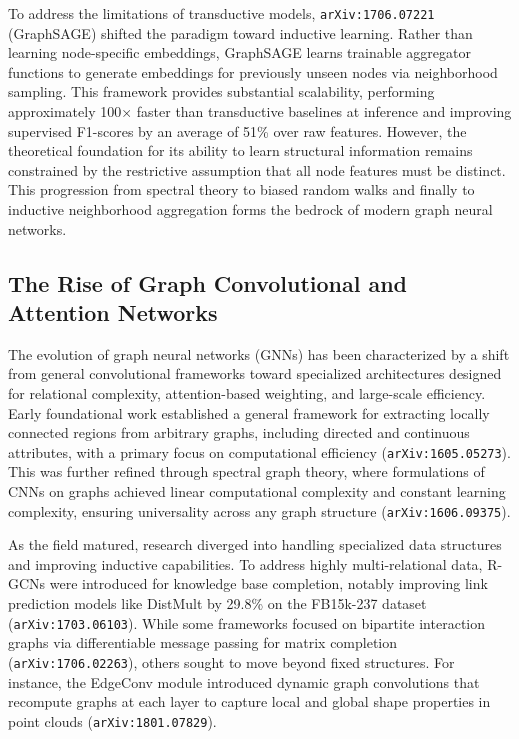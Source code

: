 \documentclass[11pt]{article}
\begin{document}
To address the limitations of transductive models, \texttt{arXiv:1706.07221} (GraphSAGE) shifted the paradigm toward inductive learning. Rather than learning node-specific embeddings, GraphSAGE learns trainable aggregator functions to generate embeddings for previously unseen nodes via neighborhood sampling. This framework provides substantial scalability, performing approximately 100× faster than transductive baselines at inference and improving supervised F1-scores by an average of 51\% over raw features. However, the theoretical foundation for its ability to learn structural information remains constrained by the restrictive assumption that all node features must be distinct. This progression from spectral theory to biased random walks and finally to inductive neighborhood aggregation forms the bedrock of modern graph neural networks.

\subsection{The Rise of Graph Convolutional and Attention Networks}

The evolution of graph neural networks (GNNs) has been characterized by a shift from general convolutional frameworks toward specialized architectures designed for relational complexity, attention-based weighting, and large-scale efficiency. Early foundational work established a general framework for extracting locally connected regions from arbitrary graphs, including directed and continuous attributes, with a primary focus on computational efficiency (\texttt{arXiv:1605.05273}). This was further refined through spectral graph theory, where formulations of CNNs on graphs achieved linear computational complexity and constant learning complexity, ensuring universality across any graph structure (\texttt{arXiv:1606.09375}).

As the field matured, research diverged into handling specialized data structures and improving inductive capabilities. To address highly multi-relational data, R-GCNs were introduced for knowledge base completion, notably improving link prediction models like DistMult by 29.8\% on the FB15k-237 dataset (\texttt{arXiv:1703.06103}). While some frameworks focused on bipartite interaction graphs via differentiable message passing for matrix completion (\texttt{arXiv:1706.02263}), others sought to move beyond fixed structures. For instance, the EdgeConv module introduced dynamic graph convolutions that recompute graphs at each layer to capture local and global shape properties in point clouds (\texttt{arXiv:1801.07829}).
\end{document}
